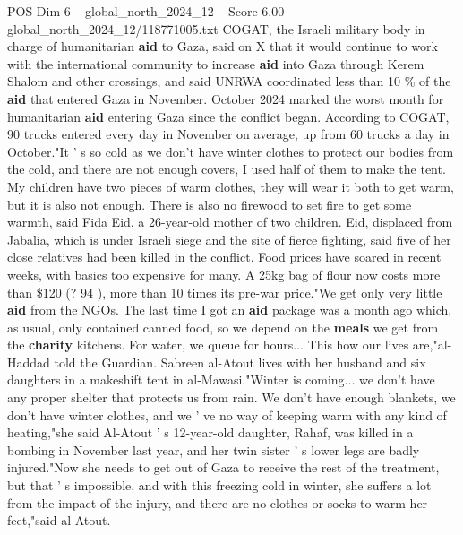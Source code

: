 \begin{textsample}{POS Dim 6 – global\_north\_2024\_12 – Score 6.00 – global\_north\_2024\_12/118771005.txt}
COGAT, the Israeli military body in charge of humanitarian \textbf{aid} to Gaza, said on X that it would continue to work with the international community to increase \textbf{aid} into Gaza through Kerem Shalom and other crossings, and said UNRWA coordinated less than 10 \% of the \textbf{aid} that entered Gaza in November.
October 2024 marked the worst month for humanitarian \textbf{aid} entering Gaza since the conflict began.
According to COGAT, 90 trucks entered every day in November on average, up from 60 trucks a day in October."It ' s so cold as we don't have winter clothes to protect our bodies from the cold, and there are not enough covers, I used half of them to make the tent.
My children have two pieces of warm clothes, they will wear it both to get warm, but it is also not enough.
There is also no firewood to set fire to get some warmth, said Fida Eid, a 26-year-old mother of two children.
Eid, displaced from Jabalia, which is under Israeli siege and the site of fierce fighting, said five of her close relatives had been killed in the conflict.
Food prices have soared in recent weeks, with basics too expensive for many.
A 25kg bag of flour now costs more than \$120 (? 94 ), more than 10 times its pre-war price."We get only very little \textbf{aid} from the NGOs.
The last time I got an \textbf{aid} package was a month ago which, as usual, only contained canned food, so we depend on the \textbf{meals} we get from the \textbf{charity} kitchens.
For water, we queue for hours...
This how our lives are,"al-Haddad told the Guardian.
Sabreen al-Atout lives with her husband and six daughters in a makeshift tent in al-Mawasi."Winter is coming... we don't have any proper shelter that protects us from rain.
We don't have enough blankets, we don't have winter clothes, and we ' ve no way of keeping warm with any kind of heating,"she said Al-Atout ' s 12-year-old daughter, Rahaf, was killed in a bombing in November last year, and her twin sister ' s lower legs are badly injured."Now she needs to get out of Gaza to receive the rest of the treatment, but that ' s impossible, and with this freezing cold in winter, she suffers a lot from the impact of the injury, and there are no clothes or socks to warm her feet,"said al-Atout.

\end{textsample}
